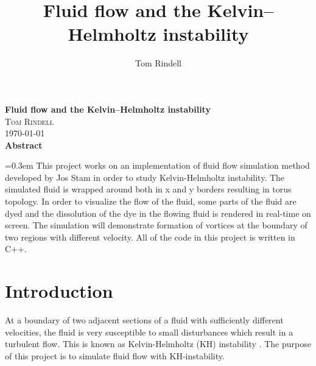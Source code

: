\documentclass[12pt, letterpaper]{article}
\author{Tom Rindell}
\title{Fluid flow and the Kelvin–Helmholtz instability}
\begin{document}
\begin{center}
  \LARGE{\bfseries Fluid flow and the Kelvin–Helmholtz instability}\\
  \vspace*{0.5cm}
  \large{\textsc{Tom Rindell}}\\
  {\textsc\today}\\
  \vspace*{1.9cm}
  \large{\bfseries Abstract}
\end{center}
\font=0.3em
This project works on an implementation of fluid flow simulation method developed by Jos Stam \cite{Stam1} in order to study Kelvin-Helmholtz instability.
The simulated fluid is wrapped around both in x and y borders resulting in torus topology.
In order to visualize the flow of the fluid, some parts of the fluid are dyed and the dissolution of the dye in the flowing fluid is rendered in real-time on screen.
The simulation will demonstrate formation of vortices at the boundary of two regions with different velocity.
All of the code in this project is written in C++.

\section{Introduction}
At a boundary of two adjacent sections of a fluid with sufficiently different velocities, the fluid is very susceptible to small disturbances which result in a turbulent flow.
This is known as Kelvin-Helmholtz (KH) instability \cite{Wiki}.
The purpose of this project is to simulate fluid flow with KH-instability.
\end{document}
